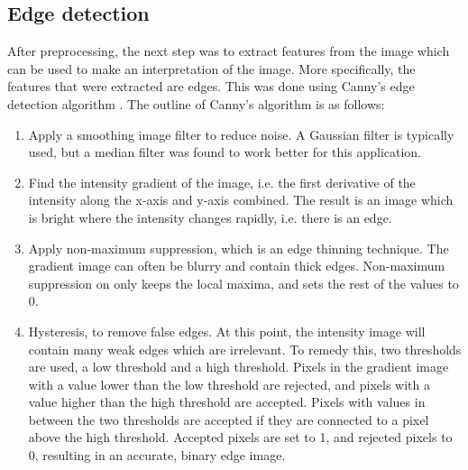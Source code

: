 \subsection{Edge detection}
After preprocessing, the next step was to extract features from the image which can be used to make an interpretation of the image.
More specifically, the features that were extracted are edges. 
This was done using Canny's edge detection algorithm \cite{canny}. %
The outline of Canny's algorithm is as follows:
\begin{enumerate}
	\item Apply a smoothing image filter to reduce noise. A Gaussian filter is typically used, but a median filter was found to work better for this application.
	\item Find the intensity gradient of the image, i.e. the first derivative of the intensity along the x-axis and y-axis combined. The result is an image which is bright where the intensity changes rapidly, i.e. there is an edge.
	\item Apply non-maximum suppression, which is an edge thinning technique. The gradient image can often be blurry and contain thick edges. Non-maximum suppression on only keeps the local maxima, and sets the rest of the values to 0.
	\item Hysteresis, to remove false edges. At this point, the intensity image will contain many weak edges which are irrelevant. To remedy this, two thresholds are used, a low threshold and a high threshold. Pixels in the gradient image with a value lower than the low threshold are rejected, and pixels with a value  higher than the high threshold are accepted. Pixels with values in between the two thresholds are accepted if they are connected to a pixel above the high threshold. Accepted pixels are set to 1, and rejected pixels to 0, resulting in an accurate, binary edge image.
\end{enumerate}

